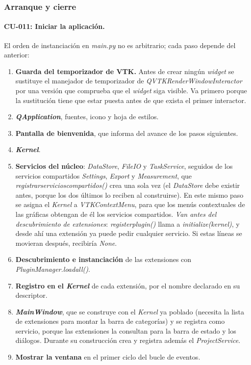 \documentclass[12pt,letterpaper,oneside]{article}
\DeclareRobustCommand{\_}{\textunderscore\allowbreak}
\begin{document}
\subsubsection{Arranque y cierre}

\paragraph{CU-011: Iniciar la aplicación.} El orden de instanciación en \textit{main.py} no es arbitrario; cada paso depende del anterior:

\begin{enumerate}
    \item \textbf{Guarda del temporizador de VTK.} Antes de crear ningún \textit{widget} se sustituye el manejador de temporizador de \textit{QVTKRenderWindowInteractor} por una versión que comprueba que el \textit{widget} siga visible. Va primero porque la sustitución tiene que estar puesta antes de que exista el primer interactor.
    \item \textbf{\textit{QApplication}}, fuentes, icono y hoja de estilos.
    \item \textbf{Pantalla de bienvenida}, que informa del avance de los pasos siguientes.
    \item \textbf{\textit{Kernel}}.
    \item \textbf{Servicios del núcleo}: \textit{DataStore}, \textit{FileIO} y \textit{TaskService}, seguidos de los servicios compartidos \textit{Settings}, \textit{Export} y \textit{Measurement}, que \textit{registrar\_servicios\_compartidos()} crea una sola vez (el \textit{DataStore} debe existir antes, porque los dos últimos lo reciben al construirse). En este mismo paso se asigna el \textit{Kernel} a \textit{VTKContextMenu}, para que los menús contextuales de las gráficas obtengan de él los servicios compartidos. \textit{Van antes del descubrimiento de extensiones}: \textit{register\_plugin()} llama a \textit{initialize(kernel)}, y desde ahí una extensión ya puede pedir cualquier servicio. Si estas líneas se movieran después, recibiría \textit{None}.
    \item \textbf{Descubrimiento e instanciación} de las extensiones con \textit{PluginManager.load\_all()}.
    \item \textbf{Registro en el \textit{Kernel}} de cada extensión, por el nombre declarado en su descriptor.
    \item \textbf{\textit{MainWindow}}, que se construye con el \textit{Kernel} ya poblado (necesita la lista de extensiones para montar la barra de categorías) y se registra como servicio, porque las extensiones la consultan para la barra de estado y los diálogos. Durante su construcción crea y registra además el \textit{ProjectService}.
    \item \textbf{Mostrar la ventana} en el primer ciclo del bucle de eventos.
\end{enumerate}
\end{document}
